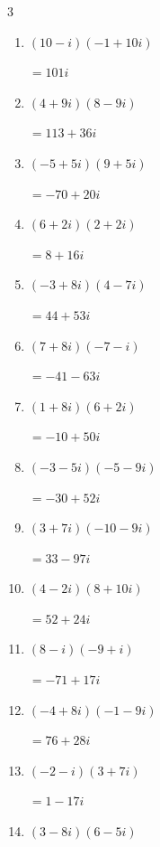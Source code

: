 \begin{multicols}{3}
\begin{enumerate}
  \item $\displaystyle (10-i)(-1+10i)$

        $\displaystyle =101i$

  \item $\displaystyle (4+9i)(8-9i)$

        $\displaystyle =113+36i$

  \item $\displaystyle (-5+5i)(9+5i)$

        $\displaystyle =-70+20i$

\columnbreak %

  \item $\displaystyle (6+2i)(2+2i)$

        $\displaystyle =8+16i$

  \item $\displaystyle (-3+8i)(4-7i)$

        $\displaystyle =44+53i$

  \item $\displaystyle (7+8i)(-7-i)$

        $\displaystyle =-41-63i$

  \item $\displaystyle (1+8i)(6+2i)$

        $\displaystyle =-10+50i$

  \item $\displaystyle (-3-5i)(-5-9i)$

        $\displaystyle =-30+52i$

  \item $\displaystyle (3+7i)(-10-9i)$

        $\displaystyle =33-97i$

  \item $\displaystyle (4-2i)(8+10i)$

        $\displaystyle =52+24i$

  \item $\displaystyle (8-i)(-9+i)$

        $\displaystyle =-71+17i$

  \item $\displaystyle (-4+8i)(-1-9i)$

        $\displaystyle =76+28i$

  \item $\displaystyle (-2-i)(3+7i)$

        $\displaystyle =1-17i$

  \item $\displaystyle (3-8i)(6-5i)$


\end{enumerate}
\end{multicols}

